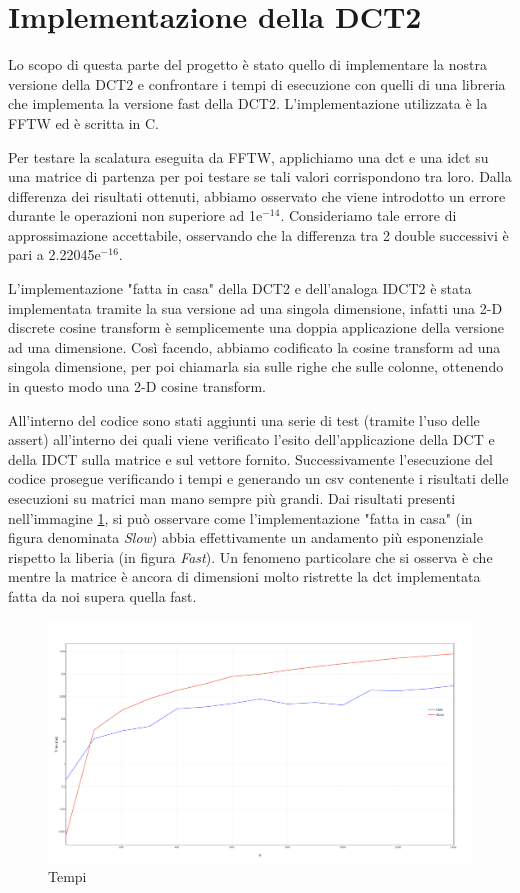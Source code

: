 	
\part{Implementazione della DCT2}

Lo scopo di questa parte del progetto è stato quello di implementare la nostra versione della DCT2 e confrontare i tempi di esecuzione con quelli di una libreria che implementa la versione fast della DCT2. L'implementazione utilizzata è la FFTW \cite{fftw} ed è scritta in C.

Per testare la scalatura eseguita da FFTW, applichiamo una dct e una idct su una matrice di partenza per poi testare se tali valori corrispondono tra loro. Dalla differenza dei risultati ottenuti, abbiamo osservato che viene introdotto un errore durante le operazioni non superiore ad 1e$^{-14}$. Consideriamo tale errore di approssimazione accettabile, osservando che la differenza tra 2 double successivi è pari a 2.22045e$^{-16}$.

L'implementazione "fatta in casa" della DCT2 e dell'analoga IDCT2 è stata implementata tramite la sua versione ad una singola dimensione, infatti una 2-D discrete cosine transform è semplicemente una doppia applicazione della versione ad una dimensione. Così facendo, abbiamo codificato la cosine transform ad una singola dimensione, per poi chiamarla sia sulle righe che sulle colonne, ottenendo in questo modo una 2-D cosine transform.

All'interno del codice sono stati aggiunti una serie di test (tramite l'uso delle assert) all'interno dei quali viene verificato l'esito dell'applicazione della DCT e della IDCT sulla matrice e sul vettore fornito. Successivamente l'esecuzione del codice prosegue verificando i tempi e generando un csv contenente i risultati delle esecuzioni su matrici man mano sempre più grandi. Dai risultati presenti nell'immagine \ref{fig:timings}, si può osservare come l'implementazione "fatta in casa" (in figura denominata \textit{Slow}) abbia effettivamente un andamento più esponenziale rispetto la liberia (in figura \textit{Fast}). Un fenomeno particolare che si osserva è che mentre la matrice è ancora di dimensioni molto ristrette la dct implementata fatta da noi supera quella fast.

\begin{figure}[ht]
	\centering
	\includegraphics[scale=0.3]{figures/timings}
	\caption{Tempi}
	\label{fig:timings}	
\end{figure}


\FloatBarrier